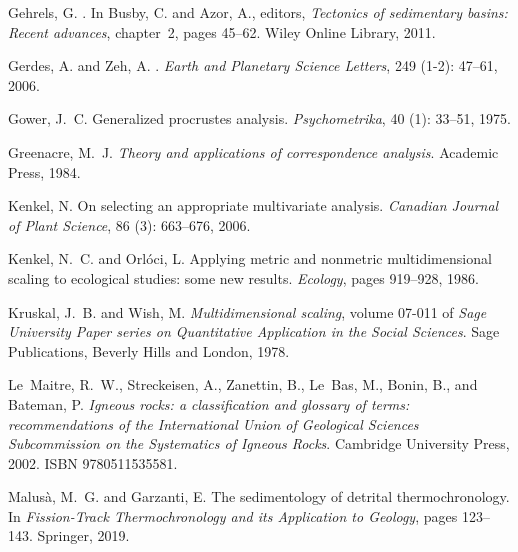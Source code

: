 \documentclass[11pt]{article}
\begin{document}
\begin{thebibliography}{68}
Gehrels, G.
.
\newblock In Busby, C. and Azor, A., editors, \emph{Tectonics of sedimentary
  basins: Recent advances}, chapter~2, pages 45--62. Wiley Online Library,
  2011.

Gerdes, A. and Zeh, A.
.
\newblock \emph{Earth and Planetary Science Letters}, 249
  (1-2): 47--61, 2006.

Gower, J.~C.
\newblock Generalized procrustes analysis.
\newblock \emph{Psychometrika}, 40 (1): 33--51, 1975.

Greenacre, M.~J.
\newblock \emph{Theory and applications of correspondence analysis}.
\newblock Academic Press, 1984.

Kenkel, N.
\newblock On selecting an appropriate multivariate analysis.
\newblock \emph{Canadian Journal of Plant Science}, 86 (3):
  663--676, 2006.

Kenkel, N.~C. and Orl{\'o}ci, L.
\newblock Applying metric and nonmetric multidimensional scaling to ecological
  studies: some new results.
\newblock \emph{Ecology}, pages 919--928, 1986.

Kruskal, J.~B. and Wish, M.
\newblock \emph{Multidimensional scaling}, volume 07-011 of \emph{Sage
  University Paper series on Quantitative Application in the Social Sciences}.
\newblock Sage Publications, Beverly Hills and London, 1978.

Le~Maitre, R.~W., Streckeisen, A., Zanettin, B., Le~Bas, M., Bonin, B., and
  Bateman, P.
\newblock \emph{{Igneous rocks: a classification and glossary of terms:
  recommendations of the International Union of Geological Sciences
  Subcommission on the Systematics of Igneous Rocks}}.
\newblock Cambridge University Press, 2002.
\newblock ISBN 9780511535581.

Malus{\`a}, M.~G. and Garzanti, E.
\newblock The sedimentology of detrital thermochronology.
\newblock In \emph{Fission-Track Thermochronology and its Application to
  Geology}, pages 123--143. Springer, 2019.


\end{thebibliography}
\end{document}
